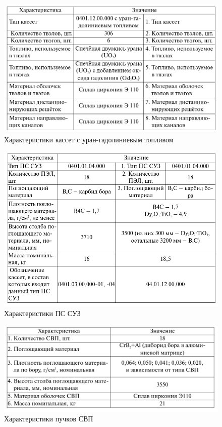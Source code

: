 \documentclass[14pt]{article}
\begin{document}
	
	\begin{figure}
	    \centering
	    \includegraphics[width=\linewidth]{Picture3}
	    \caption{Характеристики кассет с уран-гадолиниевым топливом}
	    \label{fig:my_label}
	\end{figure}
	
	\begin{figure}
	    \centering
	    \includegraphics[width=\linewidth]{Picture4}
	    \caption{Характеристики ПС СУЗ}
	    \label{fig:my_label}
	\end{figure}
	
	\begin{figure}
	    \centering
	    \includegraphics[width=\linewidth]{Picture5}
	    \caption{Характеристики пучков СВП}
	    \label{fig:my_label}
	\end{figure}
	
\end{document}
